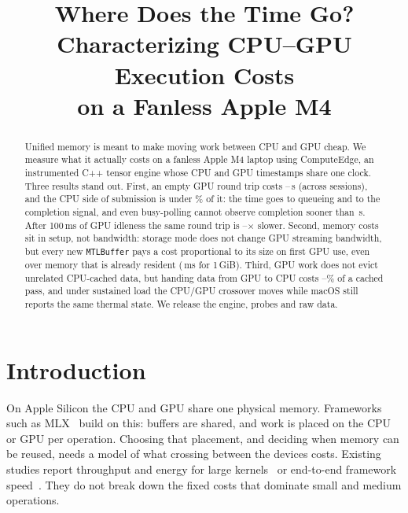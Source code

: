 \documentclass[conference,10pt]{IEEEtran}
\newcommand{\todo}[1]{\textcolor{red}{[TODO: #1]}}
\newcommand{\todo}[1]{}
\begin{document}
\title{Where Does the Time Go? Characterizing CPU--GPU Execution Costs\\on a Fanless Apple M4}

\author{
\IEEEauthorblockA{\todo{affiliation}}}

\maketitle

\begin{abstract}
Unified memory is meant to make moving work between CPU and GPU cheap. We measure what it actually costs on a
fanless Apple M4 laptop using ComputeEdge, an instrumented C++ tensor engine whose CPU and GPU timestamps share
one clock. Three results stand out. First, an empty GPU round trip costs \RoundTripUsMin{}--\RoundTripUsMax{}\,\textmu s
(across sessions), and the CPU side of submission is under \RoundTripCpuSharePctMax{}\% of it: the time goes to queueing and to the completion signal,
and even busy-polling cannot observe completion sooner than \SpinWakeFloorUs{}\,\textmu s. After 100\,ms of GPU
idleness the same round trip is \IdleHundredMsRatioMin{}--\IdleHundredMsRatioMax{}$\times$ slower. Second, memory costs sit in setup, not
bandwidth: storage mode does not change GPU streaming bandwidth, but every new \texttt{MTLBuffer} pays a cost
proportional to its size on first GPU use, even over memory that is already resident (\RewrapOneGMs{}\,ms for
1\,GiB). Third, GPU work does not evict unrelated CPU-cached data, but handing data from GPU to CPU costs
\HandoffMinPctMin{}--\HandoffMaxPctMax{}\% of a cached pass, and under sustained load the CPU/GPU crossover moves while macOS
still reports the same thermal state. We release the engine, probes and raw data.
\end{abstract}

\section{Introduction}

On Apple Silicon the CPU and GPU share one physical memory. Frameworks such as MLX~\cite{mlx} build on this:
buffers are shared, and work is placed on the CPU or GPU per operation. Choosing that placement, and deciding when
memory can be reused, needs a model of what crossing between the devices costs. Existing studies report throughput
and energy for large kernels~\cite{huebner2025apple,kenyon2022apple} or end-to-end framework speed~\cite{feng2025profiling}.
They do not break down the fixed costs that dominate small and medium operations.
\end{document}
